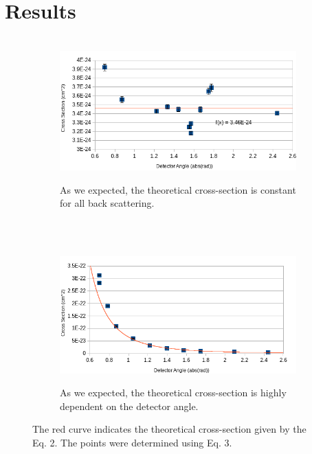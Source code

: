 \documentclass[10pt]{IEEEtran}
\begin{document}
\section{Results}
\begin{figure}[!hbt]
	\begin{center}
    \begin{subfigure}[!hbt]{0.49\textwidth}
        \\
       \includegraphics[width=\textwidth]{lowrbsres}
       \caption{As we expected, the theoretical cross-section is constant for all back scattering.}
       \label{fig:rbsres}
    \end{subfigure}\hfill
    ~ %
    \begin{subfigure}[!hbt]{0.49\textwidth}
    	    \\
       \includegraphics[width=\textwidth]{lowprdres}
       \caption{As we expected, the theoretical cross-section is highly dependent on the detector angle.}
       \label{fig:prdres}
    \end{subfigure}
    \caption{The red curve indicates the theoretical cross-section given by the Eq. 2. The points were determined using Eq. 3.}
    \label{fig:lowenergy}
    \end{center}
\end{figure}
\end{document}
